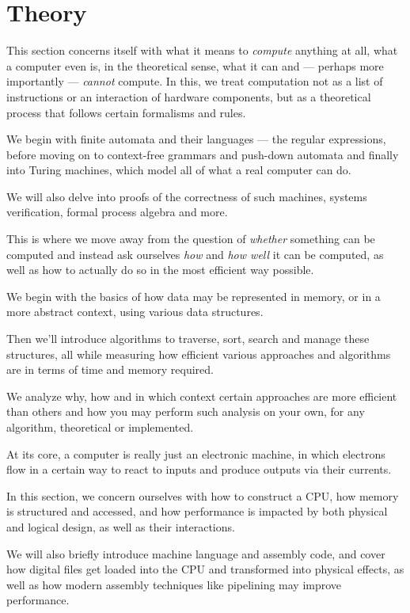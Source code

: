\section{Theory}
\begin{itemize}
  This section concerns itself with what it means to
  \emph{compute} anything at all, what a computer even is, in the theoretical
  sense, what it can and --- perhaps more importantly --- \emph{cannot} compute.
  In this, we treat computation not as a list of instructions or an interaction
  of hardware components, but as a theoretical process that follows certain
  formalisms and rules.

  We begin with finite automata and their languages --- the regular expressions,
  before moving on to context-free grammars and push-down automata and
  finally into Turing machines, which model all of what a real computer
  can do.

  We will also delve into proofs
  of the correctness of such machines, systems verification, formal process
  algebra and more.

  This is where we move away from the question of
  \emph{whether} something can be computed and instead ask ourselves
  \emph{how} and \emph{how well} it can be computed, as well as how to
  actually do so in the most efficient way possible.

  We begin with the basics of how data may be represented in memory, or in a more
  abstract context, using various data structures.

  Then we'll introduce algorithms to traverse, sort, search and manage these
  structures, all while measuring how efficient various approaches and
  algorithms are in terms of time and memory required.

  We analyze why, how and in which context certain approaches are more efficient
  than others and how you may perform such analysis on your own, for any
  algorithm, theoretical or implemented.

  At its core, a computer is really just an electronic machine, in which
  electrons flow in a certain way to react to inputs and produce outputs
  via their currents.

  In this section, we concern ourselves with how to construct a CPU, how
  memory is structured and accessed, and how performance is impacted by
  both physical and logical design, as well as their interactions.

  We will also briefly introduce machine language and assembly code,
  and cover how digital files get loaded into the CPU and transformed into
  physical effects, as well as how modern assembly techniques like pipelining
  may improve performance.


\end{itemize}
